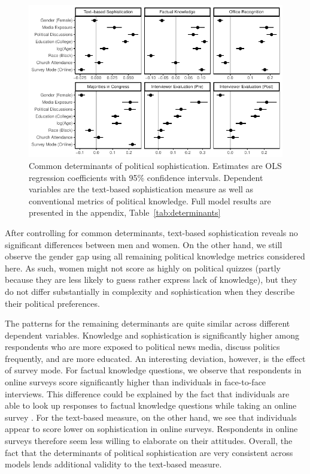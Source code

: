 \documentclass[12pt]{article}
\begin{document}
\begin{figure}[h]\centering
\includegraphics{../fig/determinants.pdf}
\caption{Common determinants of political sophistication. Estimates are OLS regression coefficients with 95\% confidence intervals. Dependent variables are the text-based sophistication measure as well as conventional metrics of political knowledge. Full model results are presented in the appendix, Table~\ref{tab:determinants}}\label{fig:determinants}
\end{figure}

After controlling for common determinants, text-based sophistication reveals no significant differences between men and women. On the other hand, we still observe the gender gap using all remaining political knowledge metrics considered here. As such, women might not score as highly on political quizzes (partly because they are less likely to guess rather express lack of knowledge), but they do not differ substantially in complexity and sophistication when they describe their political preferences.

The patterns for the remaining determinants are quite similar across different dependent variables. Knowledge and sophistication is significantly higher among respondents who are more exposed to political news media, discuss politics frequently, and are more educated. An interesting deviation, however, is the effect of survey mode. For factual knowledge questions, we observe that respondents in online surveys score significantly higher than individuals in face-to-face interviews. This difference could be explained by the fact that individuals are able to look up responses to factual knowledge questions while taking an online survey \citep[see also][]{clifford2016cheating}. For the text-based measure, on the other hand, we see that individuals appear to score lower on sophistication in online surveys. Respondents in online surveys therefore seem less willing to elaborate on their attitudes. Overall, the fact that the determinants of political sophistication are very consistent across models lends additional validity to the text-based measure.
\end{document}
